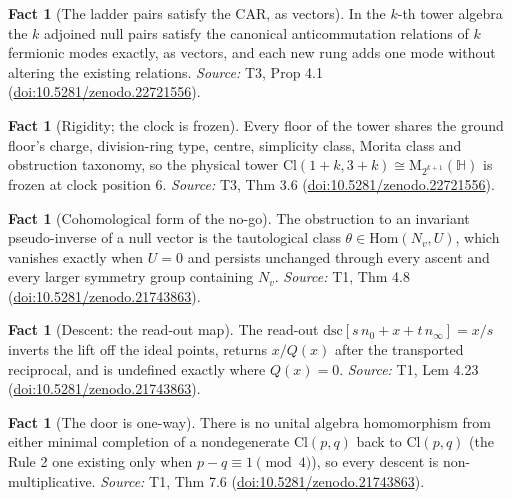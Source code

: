 \documentclass[11pt]{article}
\theoremstyle{definition}
\newtheorem{fact}[theorem]{Fact}
\theoremstyle{plain}
\providecommand{\Cl}{}\renewcommand{\Cl}{\mathrm{Cl}}
\providecommand{\HH}{}\renewcommand{\HH}{\mathbb{H}}
\providecommand{\Mat}{}\renewcommand{\Mat}{\mathrm{M}}
\providecommand{\dsc}{}\renewcommand{\dsc}{\mathrm{dsc}}
\providecommand{\nInf}{}\renewcommand{\nInf}{n_\infty}
\providecommand{\nO}{}\renewcommand{\nO}{n_0}
\begin{document}
\begin{fact}[The ladder pairs satisfy the CAR, as vectors]\label{c:tower.ladder-pairs-satisfy-car-vectors}
In the $k$-th tower algebra the $k$ adjoined null pairs satisfy the canonical anticommutation relations of $k$ fermionic modes exactly, as vectors, and each new rung adds one mode without altering the existing relations.
\emph{Source:} T3, Prop 4.1 (\href{https://doi.org/10.5281/zenodo.22721556}{doi:10.5281/zenodo.22721556}).
\end{fact}

\begin{fact}[Rigidity; the clock is frozen]\label{c:tower.rigidity-clock-frozen}
Every floor of the tower shares the ground floor's charge, division-ring type, centre, simplicity class, Morita class and obstruction taxonomy, so the physical tower $\Cl(1{+}k, 3{+}k) \cong \Mat_{2^{k+1}}(\HH)$ is frozen at clock position $6$.
\emph{Source:} T3, Thm 3.6 (\href{https://doi.org/10.5281/zenodo.22721556}{doi:10.5281/zenodo.22721556}).
\end{fact}

\begin{fact}[Cohomological form of the no-go]\label{c:transport.cohomological-form-no-go}
The obstruction to an invariant pseudo-inverse of a null vector is the tautological class $\theta \in \mathrm{Hom}(N_v, U)$, which vanishes exactly when $U = 0$ and persists unchanged through every ascent and every larger symmetry group containing $N_v$.
\emph{Source:} T1, Thm 4.8 (\href{https://doi.org/10.5281/zenodo.21743863}{doi:10.5281/zenodo.21743863}).
\end{fact}

\begin{fact}[Descent: the read-out map]\label{c:transport.descent-read-out-map}
The read-out $\dsc[s\,\nO + x + t\,\nInf] = x/s$ inverts the lift off the ideal points, returns $x/Q(x)$ after the transported reciprocal, and is undefined exactly where $Q(x) = 0$.
\emph{Source:} T1, Lem 4.23 (\href{https://doi.org/10.5281/zenodo.21743863}{doi:10.5281/zenodo.21743863}).
\end{fact}

\begin{fact}[The door is one-way]\label{c:transport.door-one-way}
There is no unital algebra homomorphism from either minimal completion of a nondegenerate $\Cl(p,q)$ back to $\Cl(p,q)$ (the Rule 2 one existing only when $p - q \equiv 1 \pmod 4$), so every descent is non-multiplicative.
\emph{Source:} T1, Thm 7.6 (\href{https://doi.org/10.5281/zenodo.21743863}{doi:10.5281/zenodo.21743863}).
\end{fact}
\end{document}
